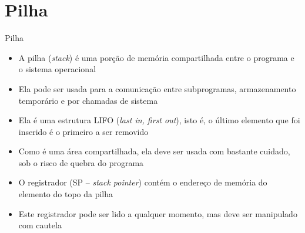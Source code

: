 \section{Pilha}

\begin{frame}[fragile]{Pilha}

    \begin{itemize}
        \item A pilha (\textit{stack}) é uma porção de memória compartilhada entre o programa e
            o sistema operacional

        \item Ela pode ser usada para a comunicação entre subprogramas, armazenamento temporário 
            e por chamadas de sistema

        \item Ela é uma estrutura LIFO (\textit{last in, first out}), isto é, o último elemento que
            foi inserido é o primeiro a ser removido

        \item Como é uma área compartilhada, ela deve ser usada com bastante cuidado, sob o risco
            de quebra do programa 

        \item O registrador  (SP -- \textit{stack pointer}) contém o endereço de                memória do elemento do topo da pilha 

        \item Este registrador pode ser lido a qualquer momento, mas deve ser manipulado com
            cautela

    \end{itemize}

\end{frame}


